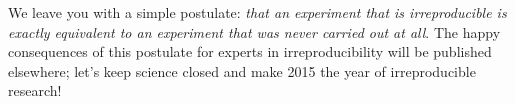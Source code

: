 \documentclass[a4paper,11pt]{article}
\begin{document}
We leave you with a simple postulate: {\emph{that an experiment that
is irreproducible is exactly equivalent to an experiment that was
never carried out at all}}. The happy consequences of this postulate
for experts in irreproducibility will be published elsewhere; let's
keep science closed and make 2015 the year of irreproducible research!
















\end{document}
